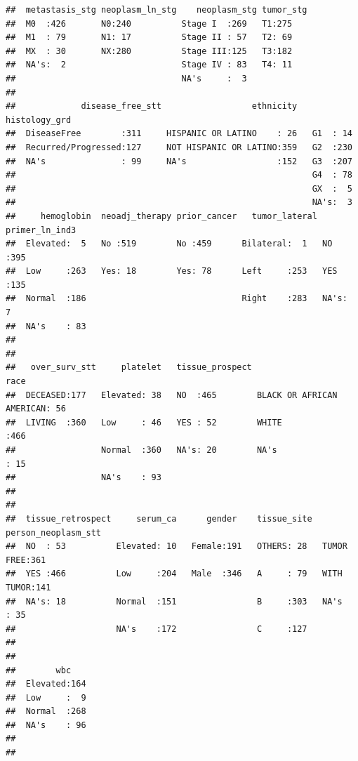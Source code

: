 \documentclass[]{article}
\begin{document}
\begin{verbatim}
##  metastasis_stg neoplasm_ln_stg    neoplasm_stg tumor_stg
##  M0  :426       N0:240          Stage I  :269   T1:275   
##  M1  : 79       N1: 17          Stage II : 57   T2: 69   
##  MX  : 30       NX:280          Stage III:125   T3:182   
##  NA's:  2                       Stage IV : 83   T4: 11   
##                                 NA's     :  3            
##                                                          
##             disease_free_stt                  ethnicity   histology_grd
##  DiseaseFree        :311     HISPANIC OR LATINO    : 26   G1  : 14     
##  Recurred/Progressed:127     NOT HISPANIC OR LATINO:359   G2  :230     
##  NA's               : 99     NA's                  :152   G3  :207     
##                                                           G4  : 78     
##                                                           GX  :  5     
##                                                           NA's:  3     
##     hemoglobin  neoadj_therapy prior_cancer   tumor_lateral primer_ln_ind3
##  Elevated:  5   No :519        No :459      Bilateral:  1   NO  :395      
##  Low     :263   Yes: 18        Yes: 78      Left     :253   YES :135      
##  Normal  :186                               Right    :283   NA's:  7      
##  NA's    : 83                                                             
##                                                                           
##                                                                           
##   over_surv_stt     platelet   tissue_prospect                        race    
##  DECEASED:177   Elevated: 38   NO  :465        BLACK OR AFRICAN AMERICAN: 56  
##  LIVING  :360   Low     : 46   YES : 52        WHITE                    :466  
##                 Normal  :360   NA's: 20        NA's                     : 15  
##                 NA's    : 93                                                  
##                                                                               
##                                                                               
##  tissue_retrospect     serum_ca      gender    tissue_site  person_neoplasm_stt
##  NO  : 53          Elevated: 10   Female:191   OTHERS: 28   TUMOR FREE:361     
##  YES :466          Low     :204   Male  :346   A     : 79   WITH TUMOR:141     
##  NA's: 18          Normal  :151                B     :303   NA's      : 35     
##                    NA's    :172                C     :127                      
##                                                                                
##                                                                                
##        wbc     
##  Elevated:164  
##  Low     :  9  
##  Normal  :268  
##  NA's    : 96  
##                
## 
\end{verbatim}
\end{document}
